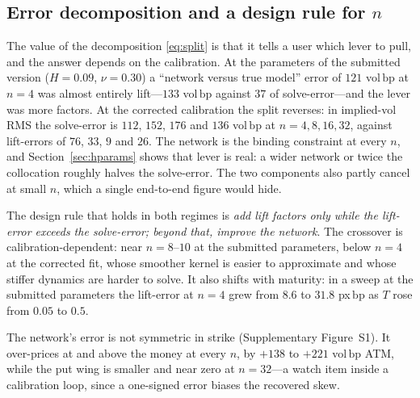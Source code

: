 \documentclass[preprint,12pt]{elsarticle}
\newcommand{\bp}{\ensuremath{\,\mathrm{bp}}}
\newif\ifrevtable
\begin{document}
\subsection{Error decomposition and a design rule for $n$}
\label{sec:decomp_results}
The value of the decomposition \eqref{eq:split} is that it tells a user which
lever to pull, and the answer depends on the calibration. At the parameters of
the submitted version ($H{=}0.09$, $\nu{=}0.30$) a ``network versus true model''
error of $121$ vol\bp{} at $n{=}4$ was almost entirely lift---$133$ vol\bp{}
against $37$ of solve-error---and the lever was more factors. At the corrected
calibration the split reverses: in implied-vol RMS the solve-error is $112$,
$152$, $176$ and $136$ vol\bp{} at $n{=}4,8,16,32$, against lift-errors of $76$,
$33$, $9$ and $26$. The network is the binding constraint at every $n$, and
Section~\ref{sec:hparams} shows that lever is real: a wider network or twice the
collocation roughly halves the solve-error. The two components also partly
cancel at small $n$, which a single end-to-end figure would hide.

The design rule that holds in both regimes is \emph{add lift factors only while
the lift-error exceeds the solve-error; beyond that, improve the network}. The
crossover is calibration-dependent: near $n{=}8$--$10$ at the submitted
parameters, below $n{=}4$ at the corrected fit, whose smoother kernel is easier to
approximate and whose stiffer dynamics are harder to solve. It also shifts with
maturity: in a sweep at the submitted parameters the lift-error at $n{=}4$ grew
from $8.6$ to $31.8$ px\bp{} as $T$ rose from $0.05$ to $0.5$.

The network's error is not symmetric in strike (Supplementary Figure~S1). It
over-prices at and above the money at every $n$, by $+138$ to $+221$ vol\bp{} ATM,
while the put wing is smaller and near zero at $n{=}32$---a watch item inside a
calibration loop, since a one-signed error biases the recovered skew.
\IfFileExists{tables/n32bias.tex}{\revtabletrue}{\revtablefalse}\ifrevtable
\end{document}
